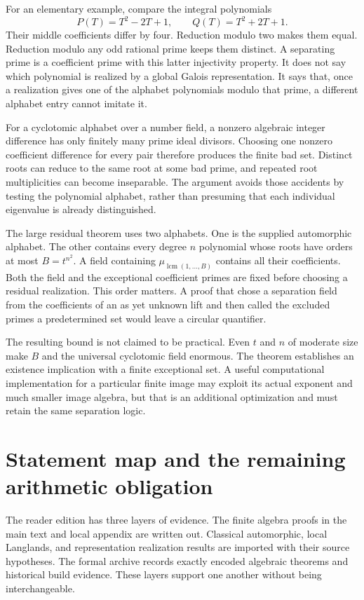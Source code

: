 For an elementary example, compare the integral polynomials
\[
 P(T)=T^2-2T+1,\qquad Q(T)=T^2+2T+1.
\]
Their middle coefficients differ by four. Reduction modulo two makes them equal. Reduction modulo any odd rational prime keeps them distinct. A separating prime is a coefficient prime with this latter injectivity property. It does not say which polynomial is realized by a global Galois representation. It says that, once a realization gives one of the alphabet polynomials modulo that prime, a different alphabet entry cannot imitate it.

For a cyclotomic alphabet over a number field, a nonzero algebraic integer difference has only finitely many prime ideal divisors. Choosing one nonzero coefficient difference for every pair therefore produces the finite bad set. Distinct roots can reduce to the same root at some bad prime, and repeated root multiplicities can become inseparable. The argument avoids those accidents by testing the polynomial alphabet, rather than presuming that each individual eigenvalue is already distinguished.

The large residual theorem uses two alphabets. One is the supplied automorphic alphabet. The other contains every degree \(n\) polynomial whose roots have orders at most \(B=t^{n^2}\). A field containing \(\mu_{\operatorname{lcm}(1,\ldots,B)}\) contains all their coefficients. Both the field and the exceptional coefficient primes are fixed before choosing a residual realization. This order matters. A proof that chose a separation field from the coefficients of an as yet unknown lift and then called the excluded primes a predetermined set would leave a circular quantifier.

The resulting bound is not claimed to be practical. Even \(t\) and \(n\) of moderate size make \(B\) and the universal cyclotomic field enormous. The theorem establishes an existence implication with a finite exceptional set. A useful computational implementation for a particular finite image may exploit its actual exponent and much smaller image algebra, but that is an additional optimization and must retain the same separation logic.

\section{Statement map and the remaining arithmetic obligation}\label{sec:statement_map}

The reader edition has three layers of evidence. The finite algebra proofs in the main text and local appendix are written out. Classical automorphic, local Langlands, and representation realization results are imported with their source hypotheses. The formal archive records exactly encoded algebraic theorems and historical build evidence. These layers support one another without being interchangeable.

